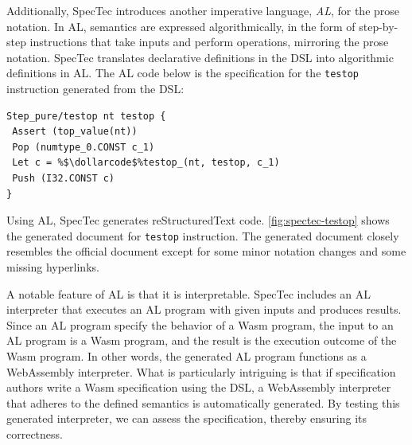 Additionally, SpecTec introduces another imperative language, \textit{AL}, for
the prose notation.
In AL, semantics are expressed algorithmically, in the form of step-by-step
instructions that take inputs and perform operations, mirroring the prose notation.
SpecTec translates declarative definitions in the DSL into algorithmic
definitions in AL.
The AL code below is the specification for the \texttt{testop} instruction
generated from the DSL:
\begin{lstlisting}[escapechar=\%]
Step_pure/testop nt testop {
 Assert (top_value(nt))
 Pop (numtype_0.CONST c_1)
 Let c = %$\dollarcode$%testop_(nt, testop, c_1)
 Push (I32.CONST c)
}
\end{lstlisting}
Using AL, SpecTec generates reStructuredText code.
\cref{fig:spectec-testop} shows the generated document for \texttt{testop}
instruction.
The generated document closely resembles the official document except for some
minor notation changes and some missing hyperlinks.


A notable feature of AL is that it is interpretable.
SpecTec includes an AL interpreter that executes an AL program with given inputs
and produces results.
Since an AL program specify the behavior of a Wasm program, the input to an AL
program is a Wasm program, and the result is the execution outcome of the Wasm
program.
In other words, the generated AL program functions as a WebAssembly interpreter.
What is particularly intriguing is that if specification authors write a Wasm
specification using the DSL, a WebAssembly interpreter that adheres to the
defined semantics is automatically generated.
By testing this generated interpreter, we can assess the specification,
thereby ensuring its correctness.
